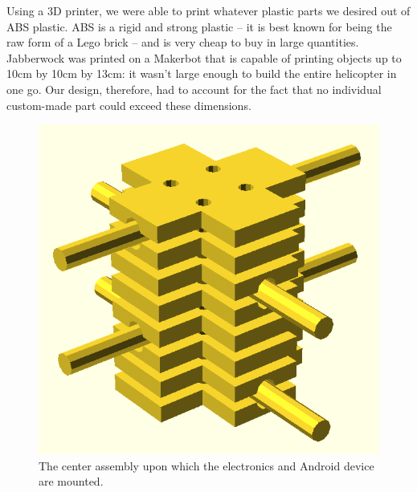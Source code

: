 Using a 3D printer, we were able to print whatever plastic parts we
desired out of ABS plastic. ABS is a rigid and strong plastic -- it is
best known for being the raw form of a Lego brick -- and is very cheap
to buy in large quantities. Jabberwock was printed on a Makerbot that
is capable of printing objects up to 10cm by 10cm by 13cm: it
wasn't large enough to build the entire helicopter in one go. Our
design, therefore, had to account for the fact that no individual
custom-made part could exceed these dimensions.

\begin{figure}[htb]
  \centering
  \includegraphics[scale=0.4]{figures/brock_assembly}
  \caption{The center assembly upon which the electronics and Android
    device are mounted.}
  \label{fig:brock}
\end{figure}

